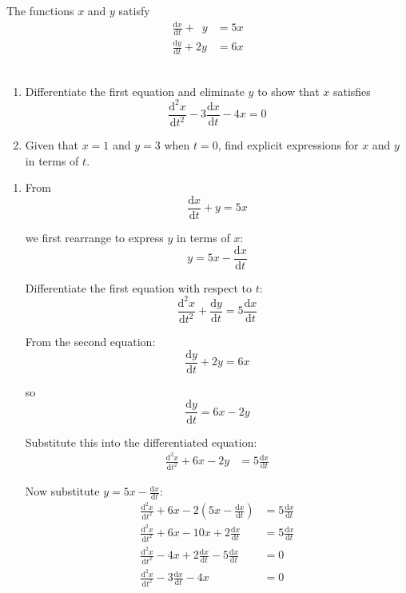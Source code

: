 \documentclass[leqno]{article}
\begin{document}
\djsFrontMatter
\begin{enumerate}[
  label=\textbf{\arabic*.},
  leftmargin=*,
  topsep=0pt,
  partopsep=0pt,
  parsep=0pt
]

\questionitem

The functions $x$ and $y$ satisfy
\begin{align*}
\frac{\mathrm{d}x}{\mathrm{d}t}+\,\,\,y&=5x\\[5pt]
\frac{\mathrm{d}y}{\mathrm{d}t}+2y&=6x
\end{align*} \\
\begin{enumerate}[label=\textbf{(\alph*)}]
  \item Differentiate the first equation and eliminate $y$ to show that $x$ satisfies\\
  \[
  \frac{\mathrm{d}^2 x}{\mathrm{d}t^2}-3\frac{\mathrm{d}x}{\mathrm{d}t}-4x=0
  \]
  \item Given that $x=1$ and $y=3$ when $t=0$, find explicit expressions for $x$ and $y$ in terms of $t$.  \\
\end{enumerate}

\vspace*{10pt}

\begin{djsSolution}
\begin{enumerate}[label=\textbf{(\alph*)}]
  \item From
\[
\frac{\mathrm{d}x}{\mathrm{d}t}+y=5x
\]

we first rearrange to express $y$ in terms of $x$:
\[
y=5x-\frac{\mathrm{d}x}{\mathrm{d}t}
\]

Differentiate the first equation with respect to $t$:
\[
\frac{\mathrm{d}^2x}{\mathrm{d}t^2}+\frac{\mathrm{d}y}{\mathrm{d}t}=5\frac{\mathrm{d}x}{\mathrm{d}t}
\]

From the second equation:
\[
\frac{\mathrm{d}y}{\mathrm{d}t}+2y=6x
\]

so
\[
\frac{\mathrm{d}y}{\mathrm{d}t}=6x-2y
\]

Substitute this into the differentiated equation:
\begin{align*}
\frac{\mathrm{d}^2x}{\mathrm{d}t^2}+6x-2y&=5\frac{\mathrm{d}x}{\mathrm{d}t}
\end{align*}

Now substitute $y=5x-\frac{\mathrm{d}x}{\mathrm{d}t}$:
\begin{align*}
\frac{\mathrm{d}^2x}{\mathrm{d}t^2}+6x-2\left(5x-\frac{\mathrm{d}x}{\mathrm{d}t}\right)&=5\frac{\mathrm{d}x}{\mathrm{d}t} \\
\frac{\mathrm{d}^2x}{\mathrm{d}t^2}+6x-10x+2\frac{\mathrm{d}x}{\mathrm{d}t}&=5\frac{\mathrm{d}x}{\mathrm{d}t} \\
\frac{\mathrm{d}^2x}{\mathrm{d}t^2}-4x+2\frac{\mathrm{d}x}{\mathrm{d}t}-5\frac{\mathrm{d}x}{\mathrm{d}t}&=0 \\
\frac{\mathrm{d}^2x}{\mathrm{d}t^2}-3\frac{\mathrm{d}x}{\mathrm{d}t}-4x&=0
\end{align*}


\end{enumerate}
\end{djsSolution}
\end{enumerate}
\end{document}
